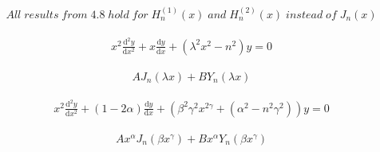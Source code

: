 






\[\begin{align} \label{thrm 4.10} All \; results \; from \; 4.8 \; hold \; for \; H_n^{(1)}(x) \; and \;H_n^{(2)}(x) \; instead \; of \; J_n(x) \end{align}\]

\[\begin{align} \label{thrm4.11(a)} x^2\frac{\mathrm d^2y}{\mathrm dx^2} + x\frac{\mathrm dy}{\mathrm dx} + (\lambda^2x^2-n^2)y = 0 \end{align}\]

\[\begin{align} \label{thrm4.11(b)} AJ_n(\lambda x) + BY_n(\lambda x) \end{align}\]

\[\begin{align} \label{thrm4.12(a)} x^2\frac{\mathrm d^2y}{\mathrm dx^2} + (1-2\alpha)\frac{\mathrm dy}{\mathrm dx} + (\beta^2\gamma^2x^{2\gamma}+(\alpha^2-n^2\gamma^2))y = 0 \end{align}\]

\[\begin{align} \label{thrm4.12(b)} Ax^{\alpha}J_n(\beta x^{\gamma})+Bx^{\alpha}Y_n(\beta x^\gamma) \end{align}\]

